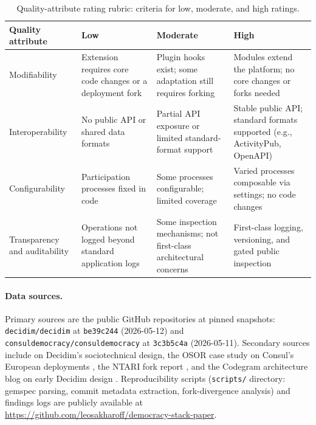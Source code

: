 \documentclass[11pt,a4paper]{article}
\begin{document}
\begin{table}[!htbp]
\centering
\caption{Quality-attribute rating rubric: criteria for low, moderate, and high ratings.}
\label{tab:qa-rubric}
\renewcommand{\arraystretch}{1.15}
\begin{tabularx}{\textwidth}{>{\raggedright\arraybackslash}p{2.5cm}XXX}
\toprule
\textbf{Quality attribute} & \textbf{Low} & \textbf{Moderate} & \textbf{High} \\
\midrule
Modifiability &
\cellcolor{quadred} Extension requires core code changes or a deployment fork &
\cellcolor{quadtan} Plugin hooks exist; some adaptation still requires forking &
\cellcolor{quadgreen} Modules extend the platform; no core changes or forks needed \\
\midrule
Interoperability &
\cellcolor{quadred} No public API or shared data formats &
\cellcolor{quadtan} Partial API exposure or limited standard-format support &
\cellcolor{quadgreen} Stable public API; standard formats supported (e.g., ActivityPub, OpenAPI) \\
\midrule
Configurability &
\cellcolor{quadred} Participation processes fixed in code &
\cellcolor{quadtan} Some processes configurable; limited coverage &
\cellcolor{quadgreen} Varied processes composable via settings; no code changes \\
\midrule
Transparency and auditability &
\cellcolor{quadred} Operations not logged beyond standard application logs &
\cellcolor{quadtan} Some inspection mechanisms; not first-class architectural concerns &
\cellcolor{quadgreen} First-class logging, versioning, and gated public inspection \\
\bottomrule
\end{tabularx}
\end{table}

\paragraph{Data sources.}
Primary sources are the public GitHub repositories at pinned snapshots: \texttt{decidim/decidim} at \texttt{be39c244} (2026-05-12) and \texttt{consuldemocracy/\allowbreak consuldemocracy} at \texttt{3c3b5c4a} (2026-05-11). Secondary sources include \citet{barandiaran2024decidim} on Decidim's sociotechnical design, the OSOR case study on Consul's European deployments \citep{linaker2025consul}, the NTARI fork report \citep{ntari2025consul}, and the Codegram architecture blog on early Decidim design \citep{codegram-decidim}. Reproducibility scripts (\texttt{scripts/} directory: gemspec parsing, commit metadata extraction, fork-divergence analysis) and findings logs are publicly available at \url{https://github.com/leosakharoff/democracy-stack-paper}.
\end{document}
